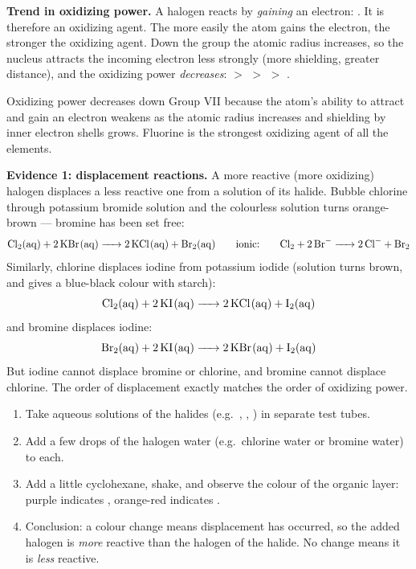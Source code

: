 \documentclass[11pt]{article}
\newcommand{\cle}[1]{{\popxbold\color{popdark}#1}}
\newcounter{popsec}
\newcounter{popsub}
\newcommand{\courssub}[1]{%
  \stepcounter{popsub}%
  \par\vspace{9pt}\noindent{\popxbold\fontsize{11.5}{13}\selectfont\color{popink}{\color{poporange}\thepopsec.\thepopsub}\hspace{6pt}#1}\par\nopagebreak\vspace{4pt}
}
\begin{document}
\courssub{Comparative Chemistry of the Halogens}

\textbf{Trend in oxidizing power.} A halogen reacts by \emph{gaining} an electron: . It is therefore an \cle{oxidizing agent}. The more easily the atom gains the electron, the stronger the oxidizing agent. Down the group the atomic radius increases, so the nucleus attracts the incoming electron less strongly (more shielding, greater distance), and the oxidizing power \emph{decreases}:  $>$  $>$  $>$ .

\begin{propriete}
Oxidizing power decreases down Group VII because the atom's ability to attract and gain an electron weakens as the atomic radius increases and shielding by inner electron shells grows. Fluorine is the strongest oxidizing agent of all the elements.
\end{propriete}

\textbf{Evidence 1: displacement reactions.} A more reactive (more oxidizing) halogen displaces a less reactive one from a solution of its halide. Bubble chlorine through potassium bromide solution and the colourless solution turns orange-brown --- bromine has been set free:
\[
\ce{Cl2(aq) + 2KBr(aq) -> 2KCl(aq) + Br2(aq)}
\qquad\text{ionic:}\qquad
\ce{Cl2 + 2Br- -> 2Cl- + Br2}
\]
Similarly, chlorine displaces iodine from potassium iodide (solution turns brown, and gives a blue-black colour with starch):
\[
\ce{Cl2(aq) + 2KI(aq) -> 2KCl(aq) + I2(aq)}
\]
and bromine displaces iodine:
\[
\ce{Br2(aq) + 2KI(aq) -> 2KBr(aq) + I2(aq)}
\]
But iodine cannot displace bromine or chlorine, and bromine cannot displace chlorine. The order of displacement exactly matches the order of oxidizing power.

\begin{methode}
\begin{enumerate}
\item Take aqueous solutions of the halides (e.g.\ , , ) in separate test tubes.
\item Add a few drops of the halogen water (e.g.\ chlorine water or bromine water) to each.
\item Add a little cyclohexane, shake, and observe the colour of the organic layer: purple indicates , orange-red indicates .
\item Conclusion: a colour change means displacement has occurred, so the added halogen is \emph{more} reactive than the halogen of the halide. No change means it is \emph{less} reactive.
\end{enumerate}
\end{methode}
\end{document}
